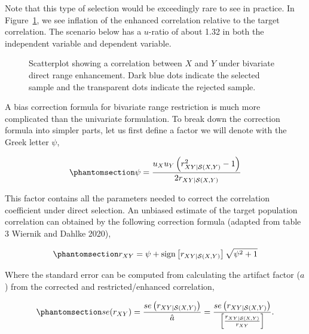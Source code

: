 \documentclass[
  letterpaper,
  DIV=11,
  numbers=noendperiod]{scrreprt}
\begin{document}
Note that this type of selection would be exceedingly rare to see in
practice. In Figure~\ref{fig-bvdre}, we see inflation of the enhanced
correlation relative to the target correlation. The scenario below has a
\(u\)-ratio of about 1.32 in both the independent variable and dependent
variable.

\begin{figure}[H]


\caption{\label{fig-bvdre}Scatterplot showing a correlation between
\(X\) and \(Y\) under bivariate direct range enhancement. Dark blue dots
indicate the selected sample and the transparent dots indicate the
rejected sample.}

\end{figure}%

A bias correction formula for bivariate range restriction is much more
complicated than the univariate formulation. To break down the
correction formula into simpler parts, let us first define a factor we
will denote with the Greek letter \(\psi\),

\begin{equation}\phantomsection\label{eq-biv-1}{
\psi = \frac{u_X u_Y\left(r_{XY|\mathcal{S}(X,Y)}^2-1\right)}{2r_{XY|\mathcal{S}(X,Y)}}
}\end{equation}

This factor contains all the parameters needed to correct the
correlation coefficient under direct selection. An unbiased estimate of
the target population correlation can obtained by the following
correction formula (adapted from table 3 Wiernik and Dahlke 2020),

\begin{equation}\phantomsection\label{eq-biv-2}{
r_{XY} = \psi + \text{sign}\left[r_{XY|\mathcal{S}(X,Y)}\right]\sqrt{\psi^2+1}
}\end{equation}

Where the standard error can be computed from calculating the artifact
factor (\(a\)) from the corrected and restricted/enhanced correlation,

\begin{equation}\phantomsection\label{eq-biv-se}{
se(r_{XY}) = \frac{se\left(r_{XY|\mathcal{S}(X,Y)}\right)}{\hat{a}}= \frac{se\left(r_{XY|\mathcal{S}(X,Y)}\right)}{\left[\frac{r_{XY|\mathcal{S}(X,Y)}}{r_{XY}}\right]}.
}\end{equation}
\end{document}
